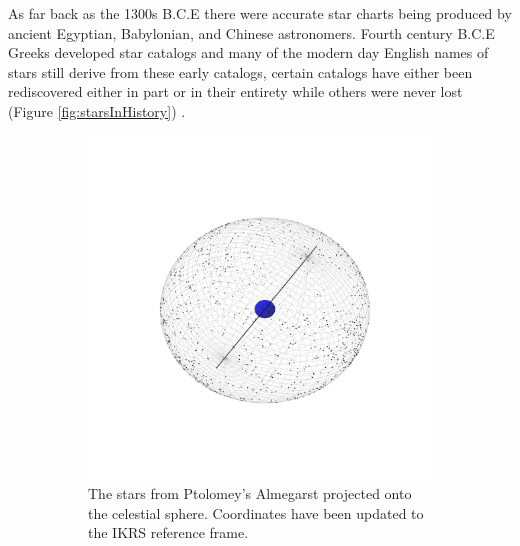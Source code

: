 As far back as the 1300s B.C.E there were accurate star charts being produced
by ancient Egyptian, Babylonian, and Chinese astronomers. Fourth century B.C.E
Greeks developed star catalogs and many of the modern day English names of stars
still derive from these early catalogs, certain catalogs have either been
rediscovered either in part or in their entirety while others were never 
lost (Figure \ref{fig:starsInHistory}) .

\begin{figure}[htbp]
  \centering
  \begin{subfigure}[t]{0.3\textwidth}
      \centering
      \includegraphics[width=\textwidth]{figures/introduction/Ptolomey.pdf}
      \caption{The stars from Ptolomey's Almegarst projected onto the celestial
      sphere. Coordinates have been updated to the IKRS reference frame.}
      \label{fig:ptolemy}
  \end{subfigure}
  \begin{subfigure}[t]{0.3\textwidth}
      \centering

\end{subfigure}
\end{figure}
